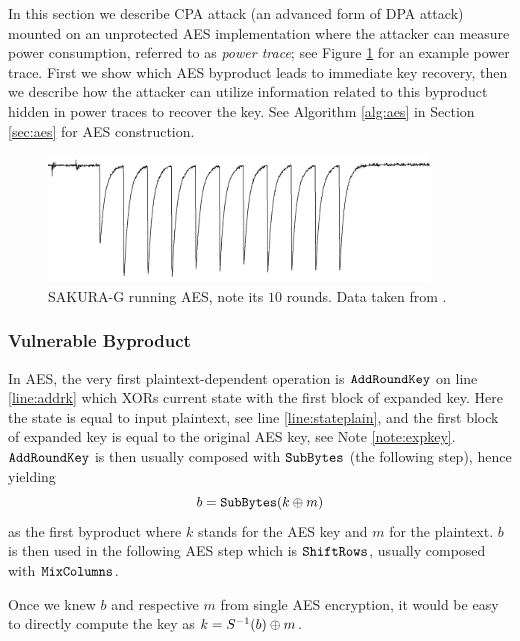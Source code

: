 In this section we describe CPA attack (an advanced form of DPA attack) mounted on an unprotected AES implementation where the attacker can measure power consumption, referred to as {\em power trace}; see Figure \ref{fig:powertrace} for an example power trace. First we show which AES byproduct leads to immediate key recovery, then we describe how the attacker can utilize information related to this byproduct hidden in power traces to recover the key. See Algorithm \ref{alg:aes} in Section \ref{sec:aes} for AES construction.

\begin{figure}[h]
\begin{center}
	\includegraphics[width=0.9\textwidth]{./figures/power_trace/power_trace.png}
	\caption{SAKURA-G running AES, note its $10$ rounds. Data taken from \cite{exampletraces}.}
	\label{fig:powertrace}
\end{center}
\end{figure}

\subsubsection{Vulnerable Byproduct}
	
	In AES, the very first plaintext-dependent operation is $\texttt{AddRoundKey}$ on line \ref{line:addrk} which XORs current state with the first block of expanded key. Here the state is equal to input plaintext, see line \ref{line:stateplain}, and the first block of expanded key is equal to the original AES key, see Note \ref{note:expkey}. $\texttt{AddRoundKey}$ is then usually composed with $\texttt{SubBytes}$ (the following step), hence yielding
	\begin{equation}
		b = \texttt{SubBytes}(k\oplus m) \label{eq:byprod}
	\end{equation}
	as the first byproduct where $k$ stands for the AES key and $m$ for the plaintext. $b$ is then used in the following AES step which is $\texttt{ShiftRows}$, usually composed with $\texttt{MixColumns}$.
		
	Once we knew $b$ and respective $m$ from single AES encryption, it would be easy to directly compute the key as $k = S^{-1}(b)\oplus m$.

